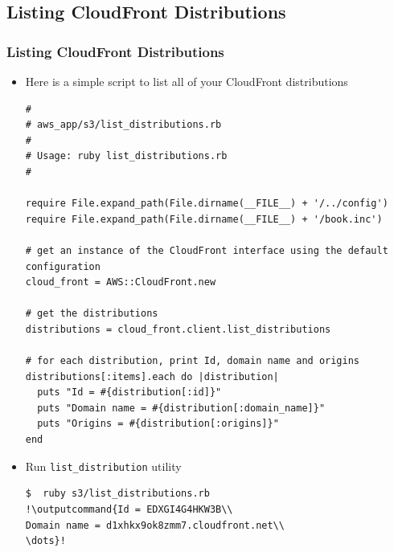 \documentclass{beamer}
\newcommand{\outputcommand}[1]{\color{darkgreen}{#1}}
\begin{document}
\subsection{Listing CloudFront Distributions}
\begin{frame}
\frametitle{Listing CloudFront Distributions}
\begin{itemize}
\item Here is a simple script to list all of your CloudFront distributions

\lstset{language=Ruby, style=eclipse}
\begin{lstlisting}[escapechar=!]
#
# aws_app/s3/list_distributions.rb
#
# Usage: ruby list_distributions.rb
#

require File.expand_path(File.dirname(__FILE__) + '/../config')
require File.expand_path(File.dirname(__FILE__) + '/book.inc')

# get an instance of the CloudFront interface using the default configuration
cloud_front = AWS::CloudFront.new

# get the distributions
distributions = cloud_front.client.list_distributions

# for each distribution, print Id, domain name and origins
distributions[:items].each do |distribution|
  puts "Id = #{distribution[:id]}"
  puts "Domain name = #{distribution[:domain_name]}"
  puts "Origins = #{distribution[:origins]}"
end
\end{lstlisting}

\item Run \texttt{list\_distribution} utility
\lstset{language=shell}
\begin{lstlisting}[escapechar=!]
$  ruby s3/list_distributions.rb 
!\outputcommand{Id = EDXGI4G4HKW3B\\
Domain name = d1xhkx9ok8zmm7.cloudfront.net\\
\dots}!
\end{lstlisting} 
\end{itemize}
\end{frame}
\end{document}
